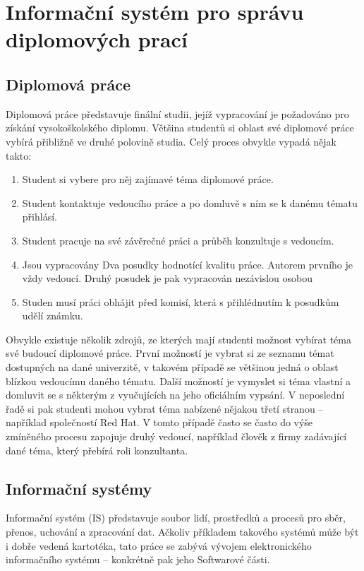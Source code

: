 \chapter{Informační systém pro správu diplomových prací}

\section{Diplomová práce}
Diplomová práce představuje finální studii, jejíž vypracování je požadováno pro získání vysokoškolského diplomu. Většina studentů si oblast své diplomové práce vybírá přibližně ve druhé polovině studia. Celý proces obvykle vypadá nějak takto:
\begin{enumerate}
    \item Student si vybere pro něj zajímavé téma diplomové práce.
    \item Student kontaktuje vedoucího práce a po domluvě s ním se k danému tématu přihlásí.
    \item Student pracuje na své závěrečné práci a průběh konzultuje s vedoucím.
    \item Jsou vypracovány Dva posudky hodnotící kvalitu práce. Autorem prvního je vždy vedoucí. Druhý posudek je pak vypracován nezávislou osobou
    \item Studen musí práci obhájit před komisí, která s přihlédnutím k posudkům udělí známku.
\end{enumerate}

Obvykle existuje několik zdrojů, ze kterých mají studenti možnost vybírat téma své budoucí diplomové práce. První možností je vybrat si ze seznamu témat dostupných na dané univerzitě, v takovém případě se většinou jedná o oblast blízkou vedoucímu daného tématu. Další možností je vymyslet si téma vlastní a domluvit se s některým z vyučujících na jeho oficiálním vypsání. V neposlední řadě si pak studenti mohou vybrat téma nabízené nějakou třetí stranou -- například společností Red Hat. V tomto případě často se často do výše zmíněného procesu zapojuje druhý vedoucí, například člověk z firmy zadávající dané téma, který přebírá roli konzultanta.

\section{Informační systémy}
Informační systém (IS) představuje soubor lidí, prostředků a procesů pro sběr, přenos, uchování a zpracování dat. Ačkoliv příkladem takového systémů může být i dobře vedená kartotéka, tato práce se zabývá vývojem elektronického informačního systému -- konkrétně pak jeho Softwarové části.

